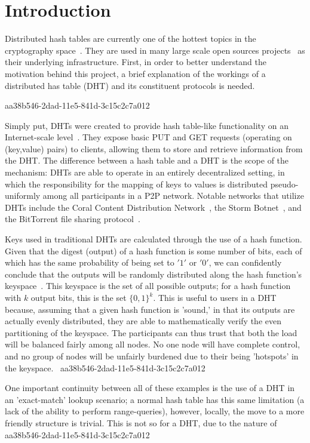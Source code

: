 \documentclass[12pt]{article}
\begin{document}
\section{Introduction}
\par Distributed hash tables are currently one of the hottest topics in the cryptography space~\cite{Stoica:2001dj,Rowstron:2001ea,Ratnasamy:2001wn}. They are used in many large scale open sources projects~\cite{Freitas:2013tb,Xu:2010vs,Perfitt:2010fh} as their underlying infrastructure. First, in order to better understand the motivation behind this project, a brief explanation of the workings of a distributed has table (DHT) and its constituent protocols is needed.

aa38b546-2dad-11e5-841d-3c15c2c7a012\par Simply put, DHTs were created to provide hash table-like functionality on an Internet-scale level~\cite{Ratnasamy:2001wn}. They expose basic PUT and GET requests (operating on (key,value) pairs) to clients, allowing them to store and retrieve information from the DHT. The difference between a hash table and a DHT is the scope of the mechanism: DHTs are able to operate in an entirely decentralized setting, in which the responsibility for the mapping of keys to values is distributed pseudo-uniformly among all participants in a P2P network. Notable networks that utilize DHTs include the Coral Content Distribution Network~\cite{Freedman:2004vb}, the Storm Botnet~\cite{Holz:2008uk}, and the BitTorrent file sharing protocol~\cite{Cohen:y1_8mBnw}.

\par Keys used in traditional DHTs are calculated through the use of a hash function. Given that the digest (output) of a hash function is some number of bits, each of which has the same probability of being set to $'1'$ or $'0'$, we can confidently conclude that the outputs will be randomly distributed along the hash function's keyspace~. This keyspace is the set of all possible outputs; for a hash function with $k$ output bits, this is the set $\{0,1\}^k$. This is useful to users in a DHT because, assuming that a given hash function is 'sound,' in that its outputs are actually evenly distributed, they are able to mathematically verify the even partitioning of the keyspace. The participants can thus trust that both the load will be balanced fairly among all nodes. No one node will have complete control, and no group of nodes will be unfairly burdened due to their being 'hotspots' in the keyspace.~
aa38b546-2dad-11e5-841d-3c15c2c7a012
\par One important continuity between all of these examples is the use of a DHT in an 'exact-match' lookup scenario; a normal hash table has this same limitation (a lack of the ability to perform range-queries), however, locally, the move to a more friendly structure is trivial. This is not so for a DHT, due to the nature of
\printbibliography
aa38b546-2dad-11e5-841d-3c15c2c7a012
\end{document}
